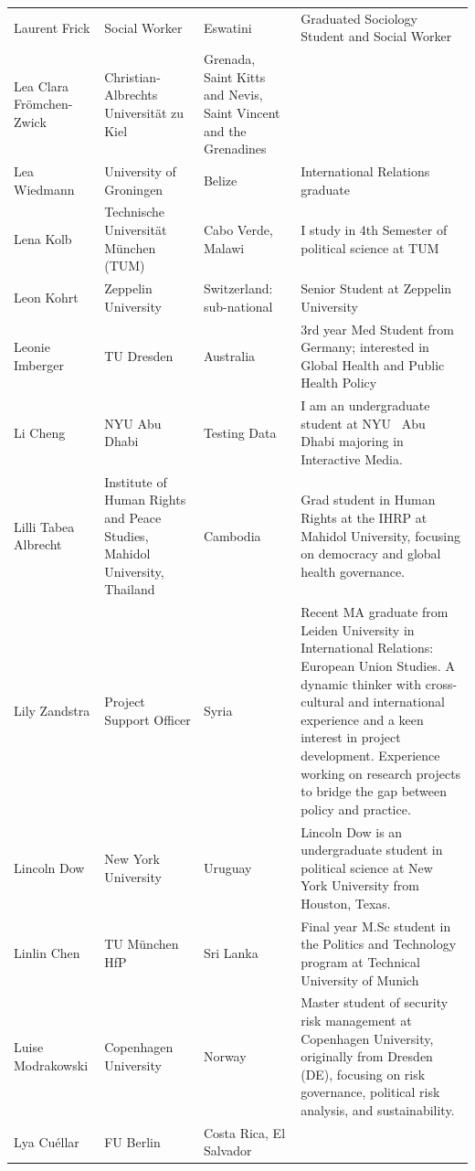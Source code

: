 \documentclass[]{article}
\begin{document}
\begin{longtable}{l>{\raggedright\arraybackslash}p{2cm}>{\raggedright\arraybackslash}p{2cm}>{\raggedright\arraybackslash}p{3cm}}
\rowcolor{gray!6}  Laurent Frick & Social Worker & Eswatini & Graduated Sociology Student and Social Worker\\
Lea Clara Frömchen-Zwick & Christian-Albrechts Universität zu Kiel & Grenada, Saint Kitts and Nevis, Saint Vincent and the Grenadines & \\
\addlinespace
\rowcolor{gray!6}  Lea Wiedmann & University of Groningen & Belize & International Relations graduate\\
Lena Kolb & Technische Universität München (TUM) & Cabo Verde, Malawi & I study in 4th Semester of political science at TUM\\
\rowcolor{gray!6}  Leon Kohrt & Zeppelin University & Switzerland: sub-national & Senior Student at Zeppelin University\\
Leonie Imberger & TU Dresden & Australia & 3rd year Med Student from Germany; interested in Global Health and Public Health Policy\\
\rowcolor{gray!6}  Li Cheng & NYU Abu Dhabi & Testing Data & I am an undergraduate student at NYU  Abu Dhabi majoring in Interactive Media.\\
\addlinespace
Lilli Tabea Albrecht & Institute of Human Rights and Peace Studies, Mahidol University, Thailand & Cambodia & Grad student in Human Rights at the IHRP at Mahidol University, focusing on democracy and global health governance.\\
\rowcolor{gray!6}  Lily Zandstra & Project Support Officer & Syria & Recent MA graduate from Leiden University in International Relations: European Union Studies. A dynamic thinker with cross-cultural and international experience and a keen interest in project development. Experience working on research projects to bridge the gap between policy and practice.\\
Lincoln Dow & New York University & Uruguay & Lincoln Dow is an undergraduate student in political science at New York University from Houston, Texas.\\
\rowcolor{gray!6}  Linlin Chen & TU München HfP & Sri Lanka & Final year M.Sc student in the Politics and Technology program at Technical University of Munich\\
Luise Modrakowski & Copenhagen University & Norway & Master student of security risk management at Copenhagen University, originally from Dresden (DE), focusing on risk governance, political risk analysis, and sustainability.\\
\addlinespace
\rowcolor{gray!6}  Lya Cuéllar & FU Berlin & Costa Rica, El Salvador & \\

\end{longtable}
\end{document}
